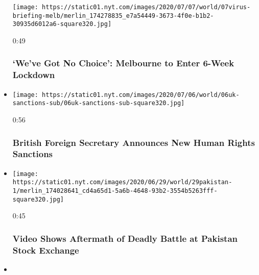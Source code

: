 \begin{itemize}
  \texttt{[image: https://static01.nyt.com/images/2020/07/07/world/07virus-briefing-melb/merlin\_174278835\_e7a54449-3673-4f0e-b1b2-30935d6012a6-square320.jpg]}

  0:49

  \hypertarget{weve-got-no-choice-melbourne-to-enter-6-week-lockdown}{%
  \subsubsection{`We've Got No Choice': Melbourne to Enter 6-Week
  Lockdown}\label{weve-got-no-choice-melbourne-to-enter-6-week-lockdown}}
\item
  \href{https://www.nytimes.com/video/us/100000007226270/britain-raab-human-rights-sanctions.html?action=click\&module=video-series-bar\&region=header\&pgtype=Article\&playlistId=video/world}{}

  \texttt{[image: https://static01.nyt.com/images/2020/07/06/world/06uk-sanctions-sub/06uk-sanctions-sub-square320.jpg]}

  0:56

  \hypertarget{british-foreign-secretary-announces-new-human-rights-sanctions}{%
  \subsubsection{British Foreign Secretary Announces New Human Rights
  Sanctions}\label{british-foreign-secretary-announces-new-human-rights-sanctions}}
\item
  \href{https://www.nytimes.com/video/world/middleeast/100000007214556/pakistan-stock-exchange.html?action=click\&module=video-series-bar\&region=header\&pgtype=Article\&playlistId=video/world}{}

  \texttt{[image: https://static01.nyt.com/images/2020/06/29/world/29pakistan-1/merlin\_174028641\_cd4a65d1-5a6b-4648-93b2-3554b5263fff-square320.jpg]}

  0:45

  \hypertarget{video-shows-aftermath-of-deadly-battle-at-pakistan-stock-exchange}{%
  \subsubsection{Video Shows Aftermath of Deadly Battle at Pakistan
  Stock
  Exchange}\label{video-shows-aftermath-of-deadly-battle-at-pakistan-stock-exchange}}
\item
  \href{https://www.nytimes.com/video/us/100000007212234/nicola-sturgeon-glasgow-attack.html?action=click\&module=video-series-bar\&region=header\&pgtype=Article\&playlistId=video/world}{}


\end{itemize}
